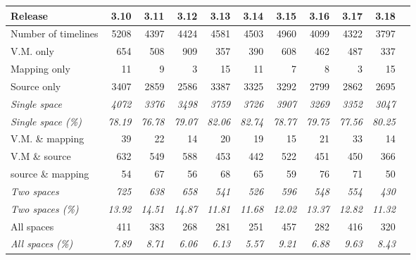 \begin{table}[h]
\centering
\begin{adjustbox}{max width=\textwidth}
\begin{tabular}{|l|r|r|r|r|r|r|r|r|r|r|}
\hline
Release	 			& 3.10 & 3.11 & 3.12 & 3.13 & 3.14 & 3.15 & 3.16 & 3.17 & 3.18\\
\hline
Number of timelines	& 5208	& 4397	& 4424	& 4581	& 4503	& 4960	&4099	&4322&3797\\
\hline
V.M. only			&654		&508		&909		&357		&390		&608		&462		&487	 &337	\\
Mapping only 		&11		&9		&3		&15		&11		&7		&8		&3	&15	\\
Source only 			&3407	&2859	&2586	&3387	&3325	&3292	&2799	&2862 &2695\\	
\emph{Single space}	&\emph{4072}	&\emph{3376}	&\emph{3498}	&\emph{3759}	&\emph{3726}	&\emph{3907}	&\emph{3269}	 &\emph{3352}	 &\emph{3047} \\
\emph{Single space (\%)}	&\emph{78.19	} &\emph{76.78}	&\emph{79.07	} &\emph{82.06}	&\emph{82.74}	&\emph{78.77}	&\emph{79.75} &\emph{77.56} & 	\emph{80.25}\\
\hline
V.M. \& mapping 		&39		&22		&14		&20		&19		&15		&21		&33 	&14	\\
V.M \&  source		&632		&549		&588		&453		&442		&522		&451		&450	  &366	\\
source \& mapping	&54		&67		&56		&68		&65		&59		&76		&71	&50	\\
\emph{Two spaces}			&\emph{725}		&\emph{638}		&\emph{658}		&\emph{541}		&\emph{526}		&\emph{596}		&\emph{548}		&\emph{554}&\emph{430} \\
\emph{Two spaces (\%)}		&\emph{13.92	}&\emph{14.51}&\emph{14.87}&\emph{11.81}&\emph{11.68}&\emph{12.02}	&\emph{13.37	}&\emph{12.82}  &\emph{11.32}\\
\hline
All spaces 			&411		&383		&268		&281		&251		&457		&282		&416	 & 320		 \\
\emph{All spaces (\%)}		&\emph{7.89}	&\emph{8.71}	&\emph{6.06}	&\emph{6.13}	&\emph{5.57}	&\emph{9.21}	&\emph{6.88}	&\emph{9.63}	&\emph{8.43}\\
\hline
\end{tabular}
\end{adjustbox}


\end{table}

